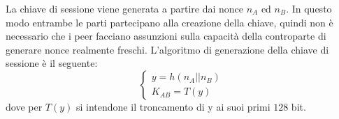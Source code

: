 	La chiave di sessione viene generata a partire dai nonce $n_A$ ed $n_B$. In questo modo entrambe le parti partecipano
	alla creazione della chiave, quindi non è necessario che i peer facciano assunzioni sulla capacità
	della controparte di generare nonce realmente freschi.
	L'algoritmo di generazione della chiave di sessione è il seguente:
	\[
		\begin{cases}
			y = h ( n_A || n_B )\\
			K_{AB} =  T(y)
		\end{cases}
	\]
	dove per $T(y)$ si intendone il troncamento di y ai suoi primi $128$ bit.
\clearpage{\pagestyle{empty}\cleardoublepage}

